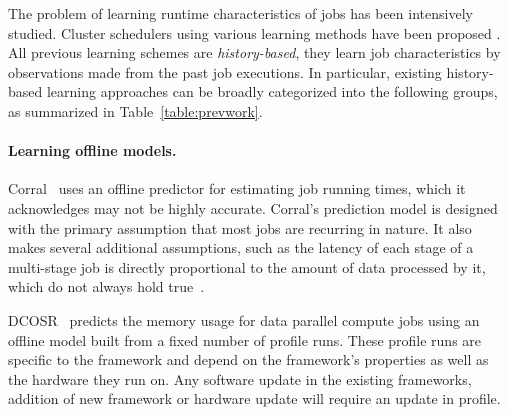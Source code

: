 The problem of learning runtime characteristics of jobs has been intensively
studied.  Cluster schedulers using various learning methods have been proposed
\cite{corral, morpheus, shufflewatcher, 3Sigma, tetrisched,
DontCryOverSpilledRecords, perforator:socc2016, Apollo:osdi2014, wsmith:IEEE98, stratus:socc2018, roughSetEstimation:IEEE:Shonali}.  All previous learning schemes
are {\em history-based}, \ie they learn job characteristics by observations
made from the past job executions. In particular, existing history-based
learning approaches can be broadly categorized into the following groups, as
summarized in Table~\ref{table:prevwork}.




\paragraph{Learning offline models.}
Corral~\cite{corral} uses an offline predictor for estimating job running
times, which it acknowledges may not be highly accurate.
\fi
Corral's prediction model is designed with the primary assumption that most
jobs are recurring in nature. It also makes several additional assumptions,
such as the latency of each stage of a multi-stage job is directly proportional
to the amount of data processed by it, which do not always hold true~\cite{corral}.

DCOSR~\cite{DontCryOverSpilledRecords} predicts the memory usage for
data parallel compute jobs using an offline model built from a fixed
number of profile runs.  These profile runs are specific to the
framework and depend on the  framework's properties as well as the
hardware they run on. Any software update in the existing frameworks,
addition of new framework or hardware update will require an update in
profile.

